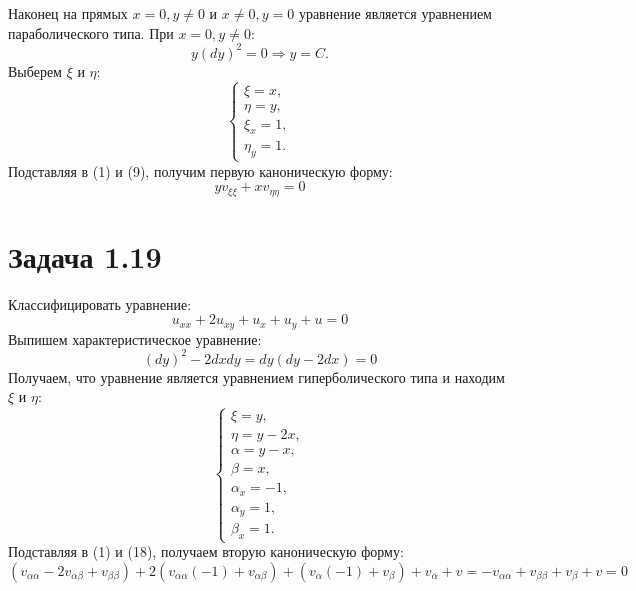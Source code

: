 \documentclass[11pt]{article}
\begin{document}
Наконец на прямых $x = 0, y \neq 0$ и $x \neq 0, y = 0$ уравнение является уравнением параболического типа.
При $x = 0, y \neq 0$:
\begin{equation}
y(dy)^2 = 0 \Rightarrow y = C.
\end{equation}
Выберем $\xi$ и $\eta$:
\begin{equation}
\begin{cases}
\xi = x, \\
\eta = y, \\
\xi_x = 1, \\
\eta_y = 1.
\end{cases}
\end{equation}
Подставляя в (1) и (9), получим первую каноническую форму:
\begin{equation}
yv_{\xi\xi} + xv_{\eta\eta} = 0
\end{equation}

\section{Задача 1.19}
\label{sec:org5f6ebb9}
Классифицировать уравнение:
\begin{equation}
u_{xx} + 2u_{xy} + u_{x} + u_{y} + u = 0
\end{equation}
Выпишем характеристическое уравнение:
\begin{equation}
(dy)^2 - 2dxdy = dy(dy - 2dx) = 0
\end{equation}
Получаем, что уравнение является уравнением гиперболического типа и находим $\xi$ и $\eta$:
\begin{equation}
\begin{cases}
\xi = y, \\
\eta = y - 2x, \\
\alpha = y - x, \\
\beta = x, \\
\alpha_x = -1, \\
\alpha_y = 1, \\
\beta_x = 1.
\end{cases}
\end{equation}
Подставляя в (1) и (18), получаем вторую каноническую форму:
\begin{equation}
(v_{\alpha\alpha} - 2v_{\alpha\beta} + v_{\beta\beta}) + 2(v_{\alpha\alpha}(-1) + v_{\alpha\beta}) +
(v_{\alpha}(-1) + v_{\beta}) + v_{\alpha} + v = -v_{\alpha\alpha} + v_{\beta\beta} + v_{\beta} + v = 0
\end{equation}
\end{document}
